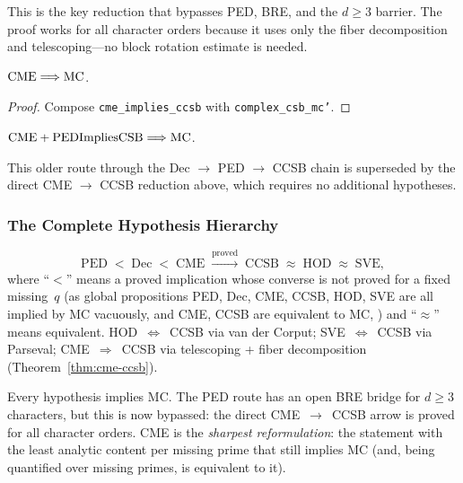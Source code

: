 This is the key reduction that bypasses PED, BRE, and the $d \geq 3$
barrier.  The proof works for all character orders because it uses
only the fiber decomposition and telescoping---no block rotation
estimate is needed.

\begin{theorem}
$\mathrm{CME} \Longrightarrow \mathrm{MC}$.
\end{theorem}

\begin{proof}
Compose \texttt{cme\_implies\_ccsb} with \texttt{complex\_csb\_mc'}.
\end{proof}

\begin{theorem}
$\mathrm{CME} + \mathrm{PEDImpliesCSB} \Longrightarrow \mathrm{MC}$.
\end{theorem}

This older route through the Dec $\to$ PED $\to$ CCSB chain is
superseded by the direct CME $\to$ CCSB reduction above, which
requires no additional hypotheses.

\subsubsection*{The Complete Hypothesis Hierarchy}

\[
\mathrm{PED} \;<\; \mathrm{Dec} \;<\; \mathrm{CME}
\;\xrightarrow{\text{proved}}\;
\mathrm{CCSB} \;\approx\; \mathrm{HOD}
\;\approx\; \mathrm{SVE},
\]
where ``$<$'' means a proved implication whose converse is not proved
for a fixed missing~$q$ (as global propositions PED, Dec, CME, CCSB, HOD, SVE
are all implied by MC vacuously, and CME, CCSB are equivalent to MC,
) and
``$\approx$'' means equivalent.
HOD~$\Leftrightarrow$~CCSB via van der Corput;
SVE~$\Leftrightarrow$~CCSB via Parseval;
CME~$\Rightarrow$~CCSB via telescoping + fiber decomposition
(Theorem~\ref{thm:cme-ccsb}).

Every hypothesis implies MC.  The PED route has an open BRE bridge
for $d \geq 3$ characters, but this is now bypassed: the direct
CME~$\to$~CCSB arrow is proved for all character orders.  CME is the
\emph{sharpest reformulation}: the statement with the least analytic
content per missing prime that still implies MC (and, being quantified
over missing primes, is equivalent to it).

